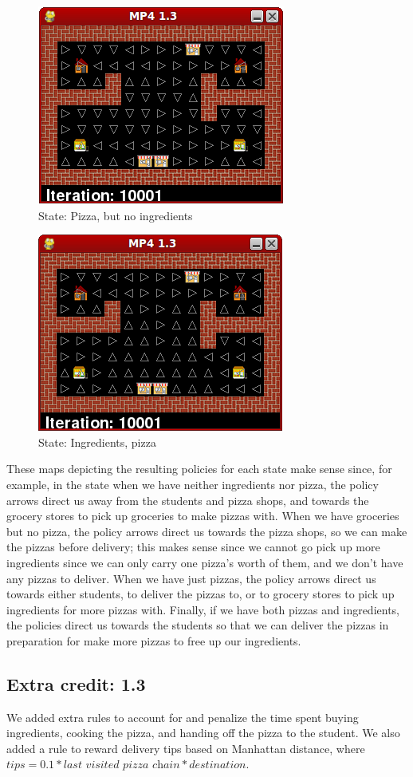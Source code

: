 \begin{figure}[H]
  \centering
  \includegraphics[width=0.4\linewidth]{graphics/state2_13.png}
  \caption{State: Pizza, but no ingredients}
\end{figure}

\begin{figure}[H]
  \centering
  \includegraphics[width=0.4\linewidth]{graphics/state3_13.png}
  \caption{State: Ingredients, pizza}
\end{figure}

These maps depicting the resulting policies for each state make sense since, for example, in the state when we have neither ingredients nor pizza, the policy arrows direct us away from the students and pizza shops, and towards the grocery stores to pick up groceries to make pizzas with. When we have groceries but no pizza, the policy arrows direct us towards the pizza shops, so we can make the pizzas before delivery; this makes sense since we cannot go pick up more ingredients since we can only carry one pizza's worth of them, and we don't have any pizzas to deliver. When we have just pizzas, the policy arrows direct us towards either students, to deliver the pizzas to, or to grocery stores to pick up ingredients for more pizzas with. Finally, if we have both pizzas and ingredients, the policies direct us towards the students so that we can deliver the pizzas in preparation for make more pizzas to free up our ingredients.

\subsection{Extra credit: 1.3}
We added extra rules to account for and penalize the time spent buying ingredients, cooking the pizza, and handing off the pizza to the student. We also added a rule to reward delivery tips based on Manhattan distance, where $tips = 0.1 * \textit{last visited pizza chain} * destination$.


